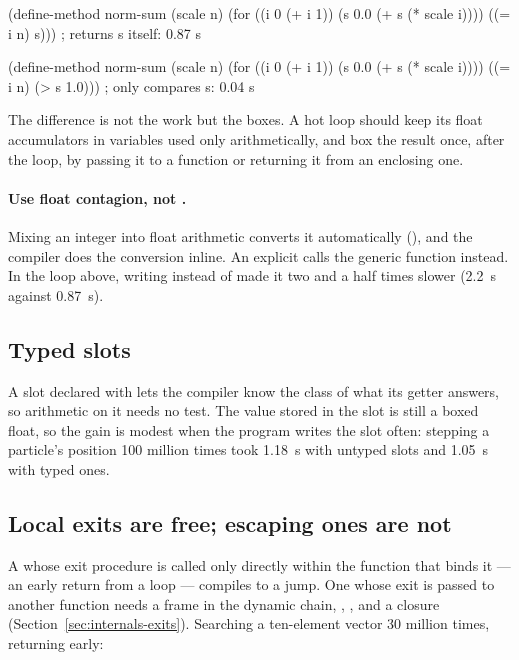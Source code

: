 \begin{dylan}
(define-method norm-sum (scale n)
  (for ((i 0 (+ i 1))
        (s 0.0 (+ s (* scale i))))
       ((= i n) s)))                    ; returns s itself: 0.87 s

(define-method norm-sum (scale n)
  (for ((i 0 (+ i 1))
        (s 0.0 (+ s (* scale i))))
       ((= i n) (> s 1.0)))             ; only compares s: 0.04 s
\end{dylan}

The difference is not the work but the boxes. A hot loop should keep its
float accumulators in variables used only arithmetically, and box the
result once, after the loop, by passing it to a function or returning it
from an enclosing one.

\paragraph{Use float contagion, not .}
Mixing an integer into float arithmetic converts it automatically
(), and the compiler does the conversion inline.
An explicit  calls the generic function
 instead. In the loop above, writing  instead of  made it two and a half
times slower (2.2~s against 0.87~s).

\subsection{Typed slots}

A slot declared with  lets the compiler know
the class of what its getter answers, so arithmetic on it needs no test.
The value stored in the slot is still a boxed float, so the gain is
modest when the program writes the slot often: stepping a particle's
position 100 million times took 1.18~s with untyped slots and 1.05~s
with typed ones.

\subsection{Local exits are free; escaping ones are not}

A  whose exit procedure is called only directly within
the function that binds it --- an early return from a loop --- compiles
to a jump. One whose exit is passed to another function needs a frame in
the dynamic chain, , , and a closure
(Section~\ref{sec:internals-exits}). Searching a ten-element vector 30
million times, returning early:


